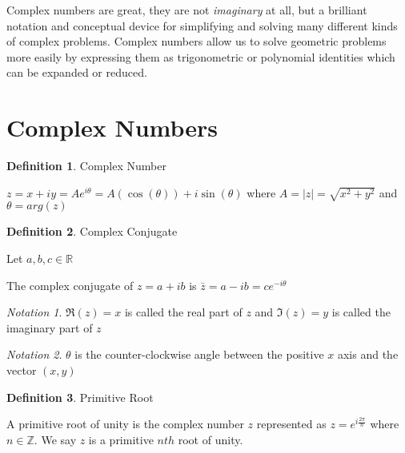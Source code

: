 \documentclass[10pt]{article}
\theoremstyle{definition}
\newtheorem*{defn}{Definition}
\theoremstyle{plain}
\theoremstyle{remark}
\newtheorem*{nota}{Notation}
\begin{document}
Complex numbers are great, they are not \emph{imaginary} at all, but a brilliant notation and conceptual device for simplifying and solving many different kinds of complex problems. Complex numbers allow us to solve geometric problems more easily by expressing them as trigonometric or polynomial identities which can be expanded or reduced. 

\section*{Complex Numbers}

\begin{defn}{Complex Number}

$z = x + iy = Ae^{i\theta} = A(\cos{(\theta)}) + i \sin{(\theta)}$ where $A = |z| = \sqrt{x^{2} + y^{2}}$ and $ \theta = arg(z)$

\end{defn}
 
\bigskip

\begin{defn}{Complex Conjugate}

Let $a, b, c \in \mathbb{R}$ 

The complex conjugate of $z = a + ib$ is $\bar{z} = a - ib = ce^{-i\theta}$
\end{defn}

\bigskip

\begin{nota}

$\Re{(z)} = x$ is called the real part of $z$ and $\Im{(z)} = y$ is called the imaginary part of $z$

\end{nota}

\bigskip

\begin{nota}

$\theta$ is the counter-clockwise angle between the positive $x$ axis and the vector $(x,y)$

\end{nota}

\bigskip

\begin{defn}{Primitive Root}

A primitive root of unity is the complex number $z$ represented as $z = e^{i\frac{2\pi}{n}}$ where $n \in \mathbb{Z}$. We say $z$ is a primitive $nth$ root of unity.
\end{defn}

\medskip
\end{document}
